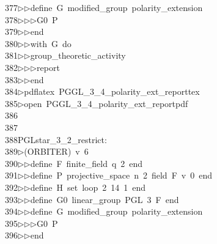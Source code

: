 \begin{tabbing}
377\>$\triangleright$\>$\triangleright$\>define\ G\ modified\_group\ polarity\_extension\ \\[0pt]
378\>$\triangleright$\>$\triangleright$\>$\triangleright$\>G0\ P\ \\[0pt]
379\>$\triangleright$\>$\triangleright$\>end\ \\[0pt]
380\>$\triangleright$\>$\triangleright$\>with\ G\ do\ \\[0pt]
381\>$\triangleright$\>$\triangleright$\>group\_theoretic\_activity\ \\[0pt]
382\>$\triangleright$\>$\triangleright$\>$\triangleright$\>report\ \\[0pt]
383\>$\triangleright$\>$\triangleright$\>end\\[0pt]
384\>$\triangleright$\>pdflatex\ PGGL\_3\_4\_polarity\_ext\_reporttex\\[0pt]
385\>$\triangleright$\>open\ PGGL\_3\_4\_polarity\_ext\_reportpdf\\[0pt]
386\>\\[0pt]
387\>\\[0pt]
388\>PGLstar\_3\_2\_restrict:\\[0pt]
389\>$\triangleright$\>(ORBITER)\ v\ 6\ \\[0pt]
390\>$\triangleright$\>$\triangleright$\>define\ F\ finite\_field\ q\ 2\ end\ \\[0pt]
391\>$\triangleright$\>$\triangleright$\>define\ P\ projective\_space\ n\ 2\ field\ F\ v\ 0\ end\ \\[0pt]
392\>$\triangleright$\>$\triangleright$\>define\ H\ set\ loop\ 2\ 14\ 1\ end\ \\[0pt]
393\>$\triangleright$\>$\triangleright$\>define\ G0\ linear\_group\ PGL\ 3\ F\ end\ \\[0pt]
394\>$\triangleright$\>$\triangleright$\>define\ G\ modified\_group\ polarity\_extension\ \\[0pt]
395\>$\triangleright$\>$\triangleright$\>$\triangleright$\>G0\ P\ \\[0pt]
396\>$\triangleright$\>$\triangleright$\>end\ \\[0pt]

\end{tabbing}
